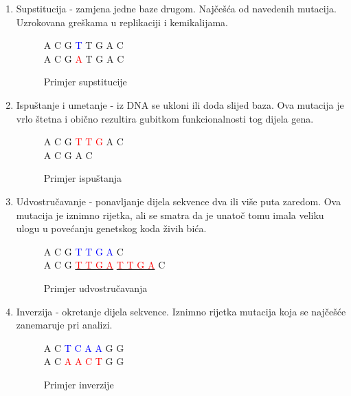 \documentclass[times, utf8, diplomski]{fer}
\begin{document}
\begin{enumerate}
\item Supstitucija - zamjena jedne baze drugom. Najčešća od navedenih mutacija.
  Uzrokovana greškama u replikaciji i kemikalijama.
  \nopagebreak
  \begin{figure}[!ht]
    \begin{center}
      A C G \textcolor{blue}{T} T G A C \\
      A C G \textcolor{red}{A} T G A C
      \caption{Primjer supstitucije}
    \end{center}
  \end{figure}

\item Ispuštanje i umetanje - iz DNA se ukloni ili doda slijed baza. Ova mutacija je vrlo štetna i obično
  rezultira gubitkom funkcionalnosti tog dijela gena.

  \nopagebreak
  \begin{figure}[!ht]
    \begin{center}
      A C G \textcolor{red}{T T G} A C \\
      A C G A C
      \caption{Primjer ispuštanja}
    \end{center}
  \end{figure}
\item Udvostručavanje - ponavljanje dijela sekvence dva ili više puta zaredom. Ova mutacija je iznimno rijetka,
  ali se smatra da je unatoč tomu imala veliku ulogu u povećanju genetskog koda živih bića.
  \begin{figure}[!ht]
    \begin{center}
      A C G \textcolor{blue}{T T G A} C \\
      A C G \underline{\textcolor{red}{T T G A}} \underline{\textcolor{red}{T T G A}} C \\
      \caption{Primjer udvostručavanja}
    \end{center}
  \end{figure}
  
\item Inverzija - okretanje dijela sekvence. Iznimno rijetka mutacija koja se najčešće zanemaruje pri analizi.
  \begin{figure}[!ht]
    \begin{center}
      A C \textcolor{blue}{T C A A} G G \\
      A C \textcolor{red} {A A C T} G G
      \caption{Primjer inverzije}
    \end{center}
\end{figure}
\end{enumerate}
\end{document}
